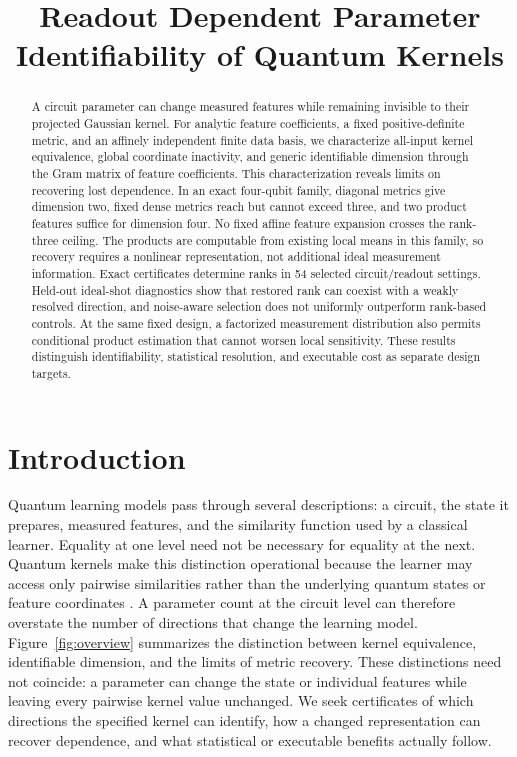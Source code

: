 \documentclass[a4paper,twocolumn,11pt,unpublished]{quantumarticle}
\begin{document}
\title{Readout Dependent Parameter Identifiability of Quantum Kernels}

\begin{abstract}
A circuit parameter can change measured features while remaining
invisible to their projected Gaussian kernel. For analytic feature
coefficients, a fixed positive-definite metric, and an affinely
independent finite data basis, we characterize all-input kernel
equivalence, global coordinate inactivity, and generic identifiable
dimension through the Gram matrix of feature coefficients. This
characterization reveals limits on recovering lost dependence.
In an exact four-qubit family, diagonal metrics give dimension two,
fixed dense metrics reach but cannot exceed three, and two product
features suffice for dimension four. No fixed affine feature expansion
crosses the rank-three ceiling. The products are computable from
existing local means in this family, so recovery requires a nonlinear
representation, not additional ideal measurement information.
Exact certificates determine ranks in 54 selected circuit/readout
settings. Held-out ideal-shot diagnostics show that restored rank
can coexist with a weakly resolved direction, and noise-aware
selection does not uniformly outperform rank-based controls.
At the same fixed design, a factorized measurement distribution
also permits conditional product estimation that cannot worsen
local sensitivity. These results distinguish identifiability,
statistical resolution, and executable cost as separate design targets.
\end{abstract}
\maketitle

\section{Introduction}
Quantum learning models pass through several descriptions: a circuit,
the state it prepares, measured features, and the similarity function
used by a classical learner. Equality at one level need not be necessary
for equality at the next. Quantum kernels make this distinction
operational because the learner may access only pairwise similarities
rather than the underlying quantum states or feature coordinates
\cite{schuld,huang}. A parameter count at the circuit level can therefore
overstate the number of directions that change the learning model.
Figure~\ref{fig:overview} summarizes the distinction between kernel
equivalence, identifiable dimension, and the limits of metric recovery.
These distinctions need not coincide: a parameter can change the state
or individual features while leaving every pairwise kernel value
unchanged. We seek certificates of which directions the specified
kernel can identify, how a changed representation can recover dependence,
and what statistical or executable benefits actually follow.
\end{document}
